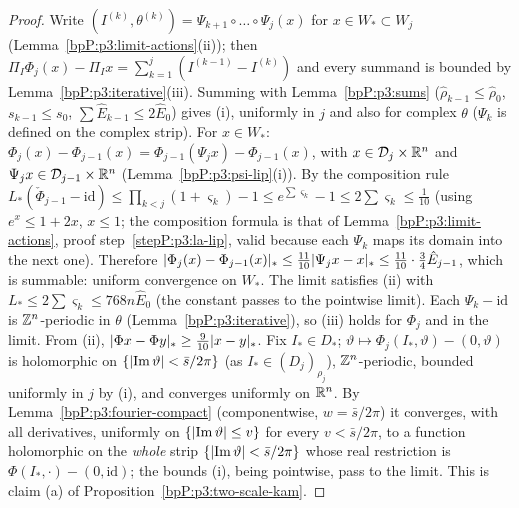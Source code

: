 \begin{proof}
\label{stepP:p3:lp-tele}
Write $(I^{(k)},\theta^{(k)})=\Psi_{k+1}\circ\dots\circ\Psi_j(x)$ for $x\in W_*\subset W_j$ (Lemma~\ref{bpP:p3:limit-actions}(ii)); then $\Pi_I\Phi_j(x)-\Pi_Ix=\sum_{k=1}^{j}(I^{(k-1)}-I^{(k)})$ and every summand is bounded by Lemma~\ref{bpP:p3:iterative}(iii). Summing with Lemma~\ref{bpP:p3:sums} ($\hat\rho_{k-1}\le\hat\rho_0$, $s_{k-1}\le s_0$, $\sum\hat E_{k-1}\le2\hat E_0$) gives (i), uniformly in $j$ and also for complex $\theta$ ($\Psi_k$ is defined on the complex strip).
\label{stepP:p3:lp-cauchy}
For $x\in W_*$: $\Phi_j(x)-\Phi_{j-1}(x)=\Phi_{j-1}(\Psi_jx)-\Phi_{j-1}(x)$, with $x\in\mathcal D_j\times\mathbb{R}^n$ and $\Psi_jx\in\mathcal D_{j-1}\times\mathbb{R}^n$ (Lemma~\ref{bpP:p3:psi-lip}(i)). By the composition rule $L_*(\check\Phi_{j-1}-\mathrm{id})\le\prod_{k<j}(1+\varsigma_k)-1\le e^{\sum\varsigma_k}-1\le2\sum\varsigma_k\le\frac1{10}$ (using $e^x\le1+2x$, $x\le1$; the composition formula is that of Lemma~\ref{bpP:p3:limit-actions}, proof step~\ref{stepP:p3:la-lip}, valid because each $\Psi_k$ maps its domain into the next one). Therefore $\lvert \Phi_j(x)-\Phi_{j-1}(x)\rvert_*\le\frac{11}{10}\lvert \Psi_jx-x\rvert_*\le\frac{11}{10}\cdot\frac34\hat E_{j-1}$, which is summable: uniform convergence on $W_*$. The limit satisfies (ii) with $L_*\le2\sum\varsigma_k\le768n\hat E_0$ (the constant passes to the pointwise limit).
\label{stepP:p3:lp-per}
Each $\Psi_k-\mathrm{id}$ is $\mathbb{Z}^n$-periodic in $\theta$ (Lemma~\ref{bpP:p3:iterative}), so (iii) holds for $\Phi_j$ and in the limit. From (ii), $\lvert \Phi x-\Phi y\rvert_*\ge\frac9{10}\lvert x-y\rvert_*$.
\label{stepP:p3:lp-an}
Fix $I_*\in D_*$; $\vartheta\mapsto\Phi_j(I_*,\vartheta)-(0,\vartheta)$ is holomorphic on $\{\lvert \operatorname{Im}\vartheta\rvert<\bar s/2\pi\}$ (as $I_*\in(D_j)_{\rho_j}$), $\mathbb{Z}^n$-periodic, bounded uniformly in $j$ by (i), and converges uniformly on $\mathbb{R}^n$. By Lemma~\ref{bpP:p3:fourier-compact} (componentwise, $w=\bar s/2\pi$) it converges, with all derivatives, uniformly on $\{\lvert \operatorname{Im}\vartheta\rvert\le v\}$ for every $v<\bar s/2\pi$, to a function holomorphic on the \emph{whole} strip $\{\lvert \operatorname{Im}\vartheta\rvert<\bar s/2\pi\}$ whose real restriction is $\Phi(I_*,\cdot)-(0,\mathrm{id})$; the bounds (i), being pointwise, pass to the limit. This is claim (a) of Proposition~\ref{bpP:p3:two-scale-kam}.
\end{proof}

